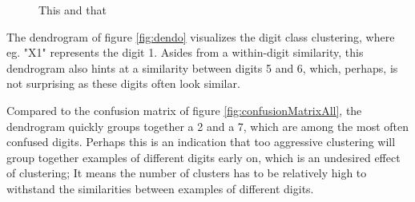 \documentclass[10pt,a4paper]{article}
\begin{document}
\begin{figure}[H]
  		 \hspace{1em}
  		\caption{This and that}
	\end{figure}


The dendrogram of figure \ref{fig:dendo} visualizes
the digit class clustering, where eg. "X1" represents the digit 1.
Asides from a within-digit similarity, this dendrogram also
hints at a similarity between digits 5 and 6, which,
perhaps, is not surprising as these digits often look similar.

Compared to the confusion matrix of figure \ref{fig:confusionMatrixAll},
the dendrogram quickly groups together a 2 and a 7,
which are among the most often confused digits.
Perhaps this is an indication that too aggressive clustering
will group together examples of different digits
early on, which is an undesired effect of clustering;
It means the number of clusters has to be relatively high
to withstand the similarities between examples of different digits.

\begin{figure}[H]
\label{fig:dendrogram}
		\centering
\end{figure}																						
\end{document}

